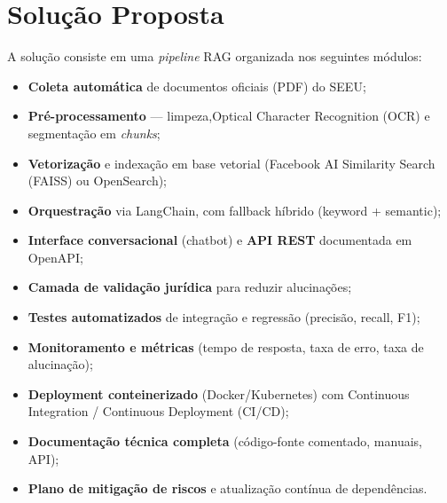 
\section{Solução Proposta}
\label{sub:solucao-proposta}

A solução consiste em uma \textit{pipeline} RAG organizada nos seguintes módulos:

\begin{itemize}[label=\textbullet]
  \item \textbf{Coleta automática} de documentos oficiais (PDF) do SEEU;
  \item \textbf{Pré-processamento} — limpeza,Optical Character Recognition (OCR) e segmentação em \emph{chunks};
  \item \textbf{Vetorização} e indexação em base vetorial (Facebook AI Similarity Search (FAISS) ou OpenSearch);
  \item \textbf{Orquestração} via LangChain, com fallback híbrido (keyword + semantic);
  \item \textbf{Interface conversacional} (chatbot) e \textbf{API REST} documentada em OpenAPI;
  \item \textbf{Camada de validação jurídica} para reduzir alucinações;
  \item \textbf{Testes automatizados} de integração e regressão (precisão, recall, F1);
  \item \textbf{Monitoramento e métricas} (tempo de resposta, taxa de erro, taxa de alucinação);
  \item \textbf{Deployment conteinerizado} (Docker/Kubernetes) com Continuous Integration / Continuous Deployment (CI/CD);
  \item \textbf{Documentação técnica completa} (código-fonte comentado, manuais, API);
  \item \textbf{Plano de mitigação de riscos} e atualização contínua de dependências.
\end{itemize}






